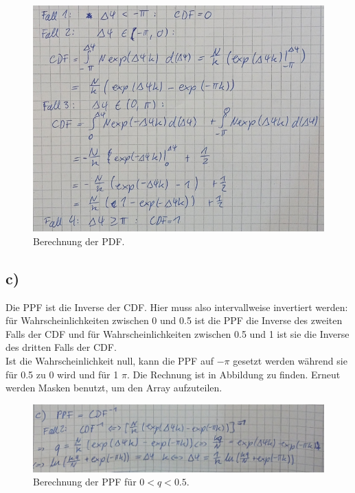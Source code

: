     \begin{figure}
        \centering
        \includegraphics[width=\textwidth]{Aufgabe9/b.png}
        \caption{Berechnung der PDF.}
        \label{fig:be}
    \end{figure}
    \FloatBarrier

\subsection{c)}
    Die PPF ist die Inverse der CDF. Hier muss also intervallweise invertiert werden: für Wahrscheinlichkeiten zwischen 0 und 0.5 ist die PPF die Inverse des zweiten Falls 
    der CDF und für Wahrscheinlichkeiten zwischen 0.5 und 1 ist sie die Inverse des dritten Falls der CDF.\\
    Ist die Wahrscheinlichkeit null, kann die PPF auf $-\pi$ gesetzt werden während sie für 0.5 zu 0 wird und für 1 $\pi$. Die Rechnung ist in Abbildung zu finden. Erneut werden 
    Masken benutzt, um den Array aufzuteilen.

    \begin{figure}
        \centering
        \includegraphics[width=\textwidth]{Aufgabe9/c1.png}
        \caption{Berechnung der PPF für $0 < q < 0.5$.}
        \label{fig:falleins}
    \end{figure}
    \FloatBarrier

